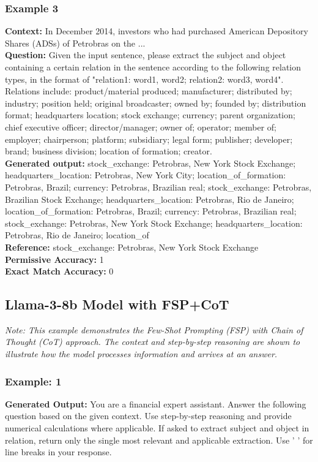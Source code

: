 \documentclass[logo,msc]{infthesis}           %
\begin{document}
\subsubsection{Example 3}
\label{rel-extraction-sample}
\textbf{Context:} In December 2014, investors who had purchased American Depository Shares (ADSs) of Petrobras on the ...
\\
\textbf{Question:} Given the input sentence, please extract the subject and object containing a certain relation in the sentence according to the following relation types, in the format of "relation1: word1, word2; relation2: word3, word4". Relations include: product/material produced; manufacturer; distributed by; industry; position held; original broadcaster; owned by; founded by; distribution format; headquarters location; stock exchange; currency; parent organization; chief executive officer; director/manager; owner of; operator; member of; employer; chairperson; platform; subsidiary; legal form; publisher; developer; brand; business division; location of formation; creator.
\\
\textbf{Generated output:} stock\_exchange: Petrobras, New York Stock Exchange; headquarters\_location: Petrobras, New York City; location\_of\_formation: Petrobras, Brazil; currency: Petrobras, Brazilian real; stock\_exchange: Petrobras, Brazilian Stock Exchange; headquarters\_location: Petrobras, Rio de Janeiro; location\_of\_formation: Petrobras, Brazil; currency: Petrobras, Brazilian real; stock\_exchange: Petrobras, New York Stock Exchange; headquarters\_location: Petrobras, Rio de Janeiro; location\_of
\\
\textbf{Reference:} stock\_exchange: Petrobras, New York Stock Exchange
\\
\textbf{Permissive Accuracy:} 1
\\
\textbf{Exact Match Accuracy:} 0

\subsection{Llama-3-8b Model with FSP+CoT}
\textit{Note: This example demonstrates the Few-Shot Prompting (FSP) with Chain of Thought (CoT) approach. The context and step-by-step reasoning are shown to illustrate how the model processes information and arrives at an answer.}
\\
\subsubsection{Example: 1}
\label{convfinqa-sample-response}
\textbf{Generated Output:} You are a financial expert assistant. Answer the following question based on the given context. Use step-by-step reasoning and provide numerical calculations where applicable. If asked to extract subject and object in relation, return only the single most relevant and applicable extraction. Use '
' for line breaks in your response.
\end{document}
